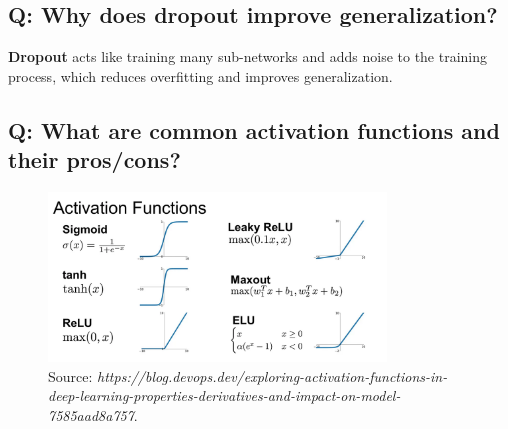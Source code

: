 \documentclass[11pt]{article}
\begin{document}
\subsection*{Q: Why does dropout improve generalization?}
\textbf{Dropout} acts like training many sub-networks and adds noise to the training process, which reduces overfitting and improves generalization.

\subsection*{Q: What are common activation functions and their pros/cons?}
\begin{figure}[H]
	\centering
	\includegraphics[width=0.8\textwidth]{activation.png}
	\caption{Source: \textit{https://blog.devops.dev/exploring-activation-functions-in-deep-learning-properties-derivatives-and-impact-on-model-7585aad8a757}.}
\end{figure}
\end{document}
